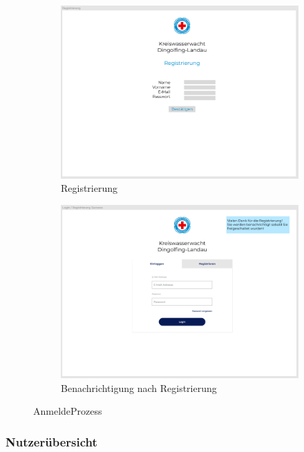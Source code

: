 \documentclass[fontsize=12pt,openright,oneside,paper=a4,BCOR=1cm]{scrbook}
\begin{document}
\begin{figure}[H]
  \centering
  \begin{subfigure}[b]{0.4\linewidth}
    \includegraphics[width=\linewidth]{Anlagen/Figma/2-Registrierung.png}
    \caption{Registrierung}
  \end{subfigure}
  \begin{subfigure}[b]{0.4\linewidth}
    \includegraphics[width=\linewidth]{Anlagen/Figma/3-LoginSuccess.png}
    \caption{Benachrichtigung nach Registrierung}
  \end{subfigure}
  \caption{AnmeldeProzess}
  \label{fig:anmeldeprozess}
\end{figure}

\subsubsection{Nutzerübersicht}
\end{document}
